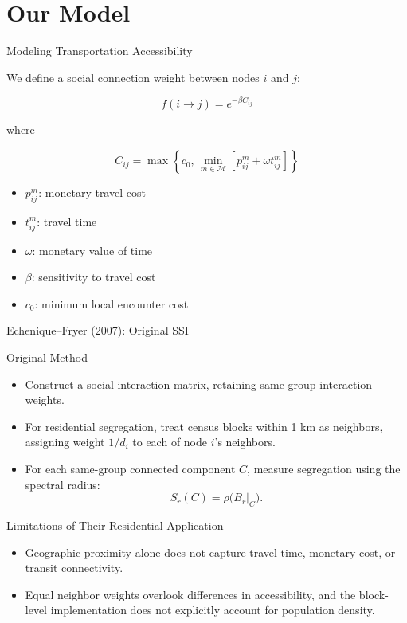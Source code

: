 \documentclass[aspectratio=169,10pt]{beamer}
\begin{document}
\section{Our Model}

\begin{frame}[shrink=0]{Modeling Transportation Accessibility}

We define a social connection weight between
nodes $i$ and $j$:

\[
f(i \to j) = e^{-\beta C_{ij}}
\]

where

\[
C_{ij} =
\max\left\{
c_0,\,
\min_{m \in \mathcal{M}}
[p_{ij}^{m}+\omega t_{ij}^{m}]
\right\}
\]

\begin{itemize}
    \item $p_{ij}^{m}$: monetary travel cost
    \item $t_{ij}^{m}$: travel time
    \item $\omega$: monetary value of time
    \item $\beta$: sensitivity to travel cost
    \item $c_0$: minimum local encounter cost
\end{itemize}

\end{frame}

\begin{frame}[shrink=0]{Echenique--Fryer (2007): Original SSI}
\small

\begin{block}{Original Method}
\begin{itemize}
    \item Construct a social-interaction matrix, retaining
    same-group interaction weights.

    \item For residential segregation, treat census blocks
    within 1 km as neighbors, assigning weight $1/d_i$
    to each of node $i$'s neighbors.

    \item For each same-group connected component $C$,
    measure segregation using the spectral radius:
    \[
       \boxed{S_r(C)=\rho\bigl(B_r|_C\bigr).}
    \]
\end{itemize}
\end{block}

\begin{block}{Limitations of Their Residential Application}
\begin{itemize}
    \item Geographic proximity alone does not capture
    travel time, monetary cost, or transit connectivity.

    \item Equal neighbor weights overlook differences in
    accessibility, and the block-level implementation
    does not explicitly account for population density.
\end{itemize}
\end{block}

\end{frame}
\end{document}
